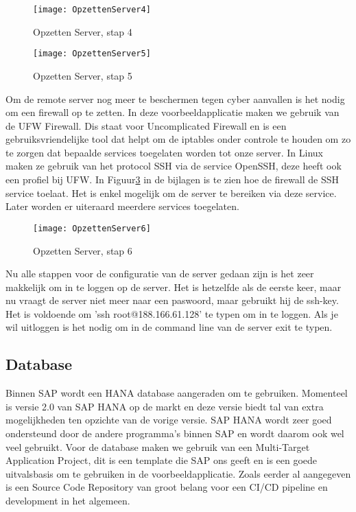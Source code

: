             \begin{figure}
                \centering
                \texttt{[image: OpzettenServer4]}
                \caption{Opzetten Server, stap 4} \label{OpzettenServer4}
            \end{figure}
        
            \begin{figure}
                \centering
                \texttt{[image: OpzettenServer5]}
                \caption{Opzetten Server, stap 5} \label{OpzettenServer5}
            \end{figure}
            
            Om de remote server nog meer te beschermen tegen cyber aanvallen is het nodig om een firewall op te zetten. In deze voorbeeldapplicatie maken we gebruik van de UFW Firewall. Dis staat voor Uncomplicated Firewall en is een gebruiksvriendelijke tool dat helpt om de iptables onder controle te houden om zo te zorgen dat bepaalde services toegelaten worden tot onze server.
            In Linux maken ze gebruik van het protocol SSH via de service OpenSSH, deze heeft ook een profiel bij UFW.
            In Figuur\ref{OpzettenServer6} in de bijlagen is te zien hoe de firewall de SSH service toelaat. Het is enkel mogelijk om de server te bereiken via deze service. Later worden er uiteraard meerdere services toegelaten.
            
            \begin{figure}
                \centering
                \texttt{[image: OpzettenServer6]}
                \caption{Opzetten Server, stap 6} \label{OpzettenServer6}
            \end{figure}
            
            Nu alle stappen voor de configuratie van de server gedaan zijn is het zeer makkelijk om in te loggen op de server.
            Het is hetzelfde als de eerste keer, maar nu vraagt de server niet meer naar een paswoord, maar gebruikt hij de ssh-key. Het is voldoende om 
            'ssh root@188.166.61.128' te typen om in te loggen.
            Als je wil uitloggen is het nodig om in de command line van de server exit te typen.
    
        \subsection{Database}
        \label{subsec:database}
        Binnen SAP wordt een HANA database aangeraden om te gebruiken. Momenteel is versie 2.0 van SAP HANA op de markt en deze versie biedt tal van extra mogelijkheden ten opzichte van de vorige versie. SAP HANA wordt zeer goed ondersteund door de andere programma's binnen SAP en wordt daarom ook wel veel gebruikt.
        Voor de database maken we gebruik van een Multi-Target Application Project, dit is een template die SAP ons geeft en is een goede uitvalsbasis om te gebruiken in de voorbeeldapplicatie.
        Zoals eerder al aangegeven is een Source Code Repository van groot belang voor een CI/CD pipeline en development in het algemeen.
        
